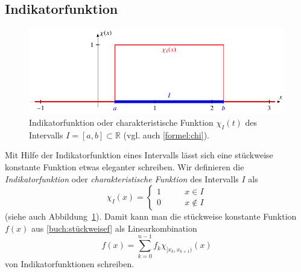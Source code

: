 \subsection{Indikatorfunktion}
\begin{figure}
\centering
\includegraphics{chapters/3-haar/images/chi.pdf}
\caption{Indikatorfunktion oder charakteristische Funktion $\chi_I(t)$
des Intervalls $I=[a,b]\subset \mathbb R$ (vgl. auch \eqref{formel:chi}).
\label{haar:figure:chi}}
\end{figure}
Mit Hilfe der Indikatorfunktion %
eines Intervalls lässt sich eine stückweise konstante Funktion etwas
eleganter schreiben.
Wir definieren  die
{\em Indikatorfunktion}
%
oder
{\em charakteristische Funktion}
des Intervalls $I$ als
\begin{equation}
\chi_{I}(x) = \begin{cases}
1&\qquad x\in I\\
0&\qquad x\not\in I
\end{cases}
\label{formel:chi}
\end{equation}
(siehe auch Abbildung~\ref{haar:figure:chi}).
Damit kann man die stückweise konstante Funktion $f(x)$ aus
\eqref{buch:stückweisef}
als Linearkombination
\[
f(x)
=
\sum_{k=0}^{n-1} f_k\chi_{[x_k,x_{k+1})}(x)
\]
von Indikatorfunktionen schreiben.

